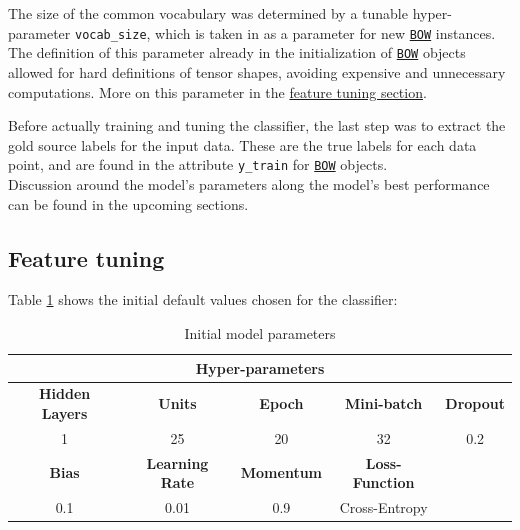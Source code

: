 The size of the common vocabulary was determined by a tunable hyper-parameter \texttt{vocab\_size}, which is taken in as a parameter for new \href{https://github.uio.no/fabior/IN5550/blob/master/Oblig1/packages/preprocessing.py}{\texttt{BOW}} instances. The definition of this parameter already in the initialization of \href{https://github.uio.no/fabior/IN5550/blob/master/Oblig1/packages/preprocessing.py}{\texttt{BOW}} objects allowed for hard definitions of tensor shapes, avoiding expensive and unnecessary computations. More on this parameter in the \hyperref[sec:tuning]{feature tuning section}. 

Before actually training and tuning the classifier, the last step was to extract the gold source labels for the input data. These are the true labels for each data point, and are found in the attribute \texttt{y\_train} for \href{https://github.uio.no/fabior/IN5550/blob/master/Oblig1/packages/preprocessing.py}{\texttt{BOW}} objects.\\

Discussion around the model's parameters along the model's best performance can be found in the upcoming sections.

\subsection{Feature tuning}
\label{sec:tuning}
\label{chap:tuning}

\quad Table \ref{table:default_params} shows the initial default values chosen for the classifier:



\begin{table}[H]
    \centering
    \begin{tabular}{ |c|c|c|c|c| }
        \hline
        \multicolumn{5}{|c|}{\textbf{Hyper-parameters}} \\
        \hline
        \textbf{Hidden Layers} & \textbf{Units} & \textbf{Epoch} & \textbf{Mini-batch} & \textbf{Dropout} \\
        \hline
        1 & 25 & 20 & 32 & 0.2 \\
        \hline
         \textbf{Bias} & \textbf{Learning Rate} & \textbf{Momentum} & \textbf{Loss-Function}& \\
        \hline
        0.1 & 0.01 & 0.9 & Cross-Entropy &\\
        \hline
    \end{tabular}
    \caption{Initial model parameters}
    \label{table:default_params}
\end{table}

